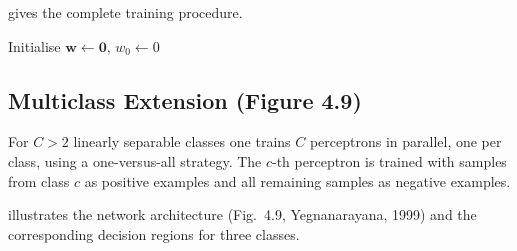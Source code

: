 \documentclass[12pt,a4paper]{article}
\begin{document}
 gives the complete training procedure.

\begin{algorithm}[ht]
\caption{Perceptron Learning Algorithm}
\label{alg:perceptron}
\SetAlgoLined
\DontPrintSemicolon
{}

Initialise $\mathbf{w} \leftarrow \mathbf{0}$, $w_0 \leftarrow 0$\;
\end{algorithm}

\subsection{Multiclass Extension (Figure 4.9)}
\label{subsec:multiclass}

For $C > 2$ linearly separable classes one trains $C$ perceptrons in
parallel, one per class, using a one-versus-all strategy.  The $c$-th
perceptron is trained with samples from class $c$ as positive examples
and all remaining samples as negative examples.

 illustrates the network architecture (Fig.~4.9,
Yegnanarayana, 1999) and the corresponding decision regions for three
classes.
\end{document}
